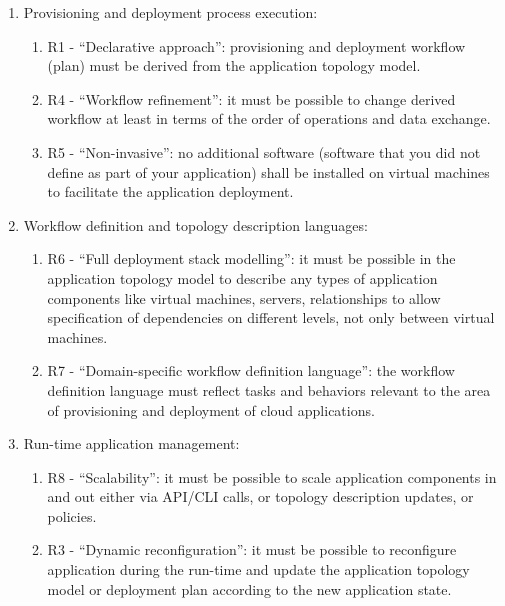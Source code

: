 \noindent 

\begin{enumerate}
\item  Provisioning and deployment process execution:
\begin{enumerate}
\item  R1 - ``Declarative approach'': provisioning and deployment workflow (plan) must be derived from the application topology model.

\item  R4 - ``Workflow refinement'': it must be possible to change derived workflow at least in terms of the order of operations and data exchange.

\item  R5 - ``Non-invasive'': no additional software (software that you did not define as part of your application) shall be installed on virtual machines to facilitate the application deployment.
\end{enumerate}

\item  Workflow definition and topology description languages:

\begin{enumerate}
\item  R6 - ``Full deployment stack modelling'': it must be possible in the application topology model to describe any types of application components like virtual machines, servers, relationships to allow specification of dependencies on different levels, not only between virtual machines. 

\item  R7 - ``Domain-specific workflow definition language'': the workflow definition language must reflect tasks and behaviors relevant to the area of provisioning and deployment of cloud applications.
\end{enumerate}

\item  Run-time application management:

\begin{enumerate}
\item  R8 - ``Scalability'': it must be possible to scale application components in and out either via API/CLI calls, or topology description updates, or policies.

\item  R3 - ``Dynamic reconfiguration'': it must be possible to reconfigure application during the run-time and update the application topology model or deployment plan according to the new application state.


\end{enumerate}
\end{enumerate}
